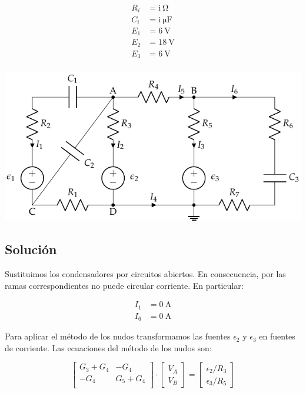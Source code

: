 \documentclass[10pt]{article}
\begin{document}
\begin{minipage}[c]{0.3\textwidth}
  \begin{align*}
    R_i &= \mathrm{i\ } \si{\ohm}\\
    C_i &= \mathrm{i\ } \si{\micro\farad}\\
    E_1 &= \SI{6}{\volt}\\
    E_2 &= \SI{18}{\volt}\\
    E_3 &= \SI{6}{\volt}\\
  \end{align*}
\end{minipage}
\begin{minipage}[c]{0.7\textwidth}
  \includegraphics[width=\textwidth]{figs/nudos_condensadores.pdf}
\end{minipage}

\subsection*{Solución}

Sustituimos los condensadores por circuitos abiertos. En consecuencia, por las ramas correspondientes no puede circular corriente. En particular:

\begin{align*}
  I_1 &= \SI{0}{\ampere}\\
  I_6 &= \SI{0}{\ampere}
\end{align*}

Para aplicar el método de los nudos transformamos las fuentes $\epsilon_2$ y $\epsilon_3$ en fuentes de corriente. Las ecuaciones del método de los nudos son:

\begin{equation*}
  \begin{bmatrix}
    G_3 + G_4 & -G_4\\
    -G_4 & G_5 + G_4\\
  \end{bmatrix} \cdot %
  \begin{bmatrix}
    V_A\\
    V_B
  \end{bmatrix} = %
  \begin{bmatrix}
    \epsilon_2/R_3\\
    \epsilon_3/R_5
  \end{bmatrix}
\end{equation*}
\end{document}
